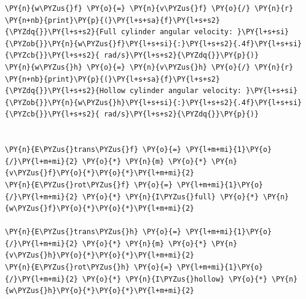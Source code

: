 \begin{tcolorbox}[breakable, size=fbox, boxrule=1pt, pad at break*=1mm,colback=cellbackground, colframe=cellborder]
\begin{Verbatim}[commandchars=\\\{\}]
\PY{n}{w\PYZus{}f} \PY{o}{=} \PY{n}{v\PYZus{}f} \PY{o}{/} \PY{n}{r}
\PY{n+nb}{print}\PY{p}{(}\PY{l+s+sa}{f}\PY{l+s+s2}{\PYZdq{}}\PY{l+s+s2}{Full cylinder angular velocity: }\PY{l+s+si}{\PYZob{}}\PY{n}{w\PYZus{}f}\PY{l+s+si}{:}\PY{l+s+s2}{.4f}\PY{l+s+si}{\PYZcb{}}\PY{l+s+s2}{ rad/s}\PY{l+s+s2}{\PYZdq{}}\PY{p}{)}
\PY{n}{w\PYZus{}h} \PY{o}{=} \PY{n}{v\PYZus{}h} \PY{o}{/} \PY{n}{r}
\PY{n+nb}{print}\PY{p}{(}\PY{l+s+sa}{f}\PY{l+s+s2}{\PYZdq{}}\PY{l+s+s2}{Hollow cylinder angular velocity: }\PY{l+s+si}{\PYZob{}}\PY{n}{w\PYZus{}h}\PY{l+s+si}{:}\PY{l+s+s2}{.4f}\PY{l+s+si}{\PYZcb{}}\PY{l+s+s2}{ rad/s}\PY{l+s+s2}{\PYZdq{}}\PY{p}{)}


\PY{n}{E\PYZus{}trans\PYZus{}f} \PY{o}{=} \PY{l+m+mi}{1}\PY{o}{/}\PY{l+m+mi}{2} \PY{o}{*} \PY{n}{m} \PY{o}{*} \PY{n}{v\PYZus{}f}\PY{o}{*}\PY{o}{*}\PY{l+m+mi}{2}
\PY{n}{E\PYZus{}rot\PYZus{}f} \PY{o}{=} \PY{l+m+mi}{1}\PY{o}{/}\PY{l+m+mi}{2} \PY{o}{*} \PY{n}{I\PYZus{}full} \PY{o}{*} \PY{n}{w\PYZus{}f}\PY{o}{*}\PY{o}{*}\PY{l+m+mi}{2}

\PY{n}{E\PYZus{}trans\PYZus{}h} \PY{o}{=} \PY{l+m+mi}{1}\PY{o}{/}\PY{l+m+mi}{2} \PY{o}{*} \PY{n}{m} \PY{o}{*} \PY{n}{v\PYZus{}h}\PY{o}{*}\PY{o}{*}\PY{l+m+mi}{2}
\PY{n}{E\PYZus{}rot\PYZus{}h} \PY{o}{=} \PY{l+m+mi}{1}\PY{o}{/}\PY{l+m+mi}{2} \PY{o}{*} \PY{n}{I\PYZus{}hollow} \PY{o}{*} \PY{n}{w\PYZus{}h}\PY{o}{*}\PY{o}{*}\PY{l+m+mi}{2}


\end{Verbatim}
\end{tcolorbox}
